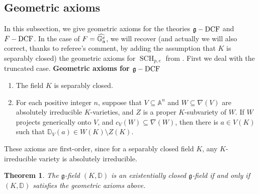 \documentclass[10pt]{amsart}
\DeclareMathOperator{\sch}{SCH}\DeclareMathOperator{\strict}{strict}\DeclareMathOperator{\der}{Der}\DeclareMathOperator{\acf}{ACF}
\newtheorem{theorem}{Theorem}[section]
\theoremstyle{definition}
\begin{document}
\subsection{Geometric axioms}\label{secgag}
 In this subsection, we give geometric axioms for the theories $\mathfrak{g}-\operatorname{DCF}$ and $F-\operatorname{DCF}$. In the case of $F=\widehat{\mathbb{G}_{\rm{a}}^e}$, we will recover (and actually we will also correct, thanks to referee's comment, by adding the assumption that $K$ is separably closed) the geometric axioms for $\sch_{p,e}$ from \cite[Theorem 4.3]{K3}. First we deal with the truncated case.
\bigskip
\newline
{\bf Geometric axioms for $\mathfrak{g}-\operatorname{DCF}$}
\begin{enumerate}
\item The field $K$ is separably closed.

\item For each positive integer $n$, suppose that $V\subseteq {\mathbb A}^n$ and $W\subseteq \nabla(V)$ are
absolutely irreducible $K$-varieties, and $Z$ is a proper $K$-subvariety
of $W$. If $W$ projects generically onto $V$, and $c_{V}(W)\subseteq
\nabla (W)$, then there is $a\in V(K)$ such that $\mathbb{D}_{V}(a)\in W(K)\setminus Z(K)$.
\end{enumerate}
\noindent
These axioms are first-order, since for a separably closed field $K$, any $K$-irreducible variety is absolutely irreducible.
\begin{theorem}\label{ggeo}
The $\mathfrak{g}$-field $(K,\mathbb{D})$ is an existentially
closed $\mathfrak{g}$-field if and only if $(K,\mathbb{D})$ satisfies the geometric axioms above.
\end{theorem}
\end{document}
